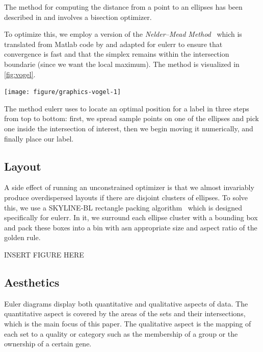 \documentclass[a4paper,nofonts,nobib,titlepage,justified,marginals=raggedouter,nohyper]{tufte-handout}\usepackage[]{graphicx}\usepackage[]{color}
\newenvironment{knitrout}{}{} %
\newcommand{\pkg}[1]{{\fontseries{b}\selectfont #1}}
\begin{document}
The method for computing the distance from a point to an ellipses has
been described in \citet{eberly_x} and involves a bisection optimizer.

To optimize this, we employ a version of the
\emph{Nelder--Mead Method}~\citep{nelder_1965} which is translated from Matlab
code by \citet{kelley_1999} and adapted for \pkg{eulerr} to ensure that convergence
is fast and that
the simplex remains within the intersection boundarie (since we want
the local maximum). The method is visualized in \cref{fig:vogel}.
\begin{marginfigure}
\begin{knitrout}
\color{fgcolor}

{\centering \texttt{[image: figure/graphics-vogel-1]} 

}



\end{knitrout}
\caption{The method eulerr uses to locate an optimal position for a label in three steps from top to bottom: first, we spread sample points on one of the ellipses and pick one inside the intersection of interest, then we begin moving it numerically, and finally place our label.}
\label{fig:vogel}
\end{marginfigure}

\subsection{Layout}
\label{sec:layout}

A side effect of running an unconstrained optimizer is that we almost invariably
produce overdispersed layouts if there are disjoint clusters of ellipses. To
solve this, we use a SKYLINE-BL rectangle packing algorithm~\citep{jylanki_2010}
which is designed specifically for \pkg{eulerr}. In it, we surround each
ellipse cluster with a bounding box and pack these boxes into a bin with asn
appropriate size and aspect ratio of the golden rule.

INSERT FIGURE HERE

\subsection{Aesthetics}
\label{sec:aesthetics}

Euler diagrams display both quantitative and qualitative aspects of data.
The quantitative aspect is covered by the areas of the sets and their
intersections, which is the main focus of this paper. The qualitative aspect
is the mapping of each set to a quality or category such as the membership of a
group or the ownership of a certain gene.
\end{document}
